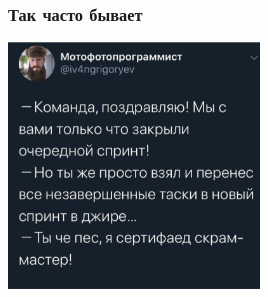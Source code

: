 \documentclass[xetex,mathserif,serif]{beamer}
\begin{document}
    \begin{frame}
        \frametitle{Так часто бывает}
        \begin{center}
            \includegraphics[width=0.5\textwidth]{scrum-master.png}
        \end{center}
    \end{frame}
\end{document}
